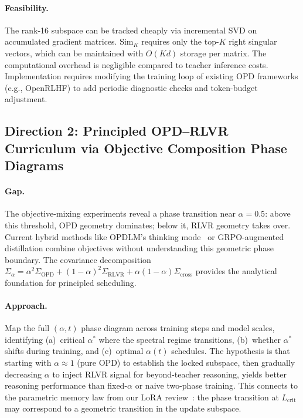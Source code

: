 \documentclass[11pt,a4paper]{article}
\begin{document}
\paragraph{Feasibility.} The rank-16 subspace can be tracked cheaply via incremental SVD on accumulated gradient matrices. Sim$_K$ requires only the top-$K$ right singular vectors, which can be maintained with $O(Kd)$ storage per matrix. The computational overhead is negligible compared to teacher inference costs. Implementation requires modifying the training loop of existing OPD frameworks (e.g., OpenRLHF) to add periodic diagnostic checks and token-budget adjustment.

\subsection{Direction 2: Principled OPD--RLVR Curriculum via Objective Composition Phase Diagrams}

\paragraph{Gap.} The objective-mixing experiments reveal a phase transition near $\alpha = 0.5$: above this threshold, OPD geometry dominates; below it, RLVR geometry takes over. Current hybrid methods like OPDLM's thinking mode~\cite{su2026opdlm} or GRPO-augmented distillation combine objectives without understanding this geometric phase boundary. The covariance decomposition $\Sigma_\alpha = \alpha^2 \Sigma_{\mathrm{OPD}} + (1\!-\!\alpha)^2 \Sigma_{\mathrm{RLVR}} + \alpha(1\!-\!\alpha)\Sigma_{\mathrm{cross}}$ provides the analytical foundation for principled scheduling.

\paragraph{Approach.} Map the full $(\alpha, t)$ phase diagram across training steps and model scales, identifying (a)~critical $\alpha^*$ where the spectral regime transitions, (b)~whether $\alpha^*$ shifts during training, and (c)~optimal $\alpha(t)$ schedules. The hypothesis is that starting with $\alpha \approx 1$ (pure OPD) to establish the locked subspace, then gradually decreasing $\alpha$ to inject RLVR signal for beyond-teacher reasoning, yields better reasoning performance than fixed-$\alpha$ or naive two-phase training. This connects to the parametric memory law from our LoRA review~\cite{gao2026lora}: the phase transition at $L_{\mathrm{crit}}$ may correspond to a geometric transition in the update subspace.
\end{document}
